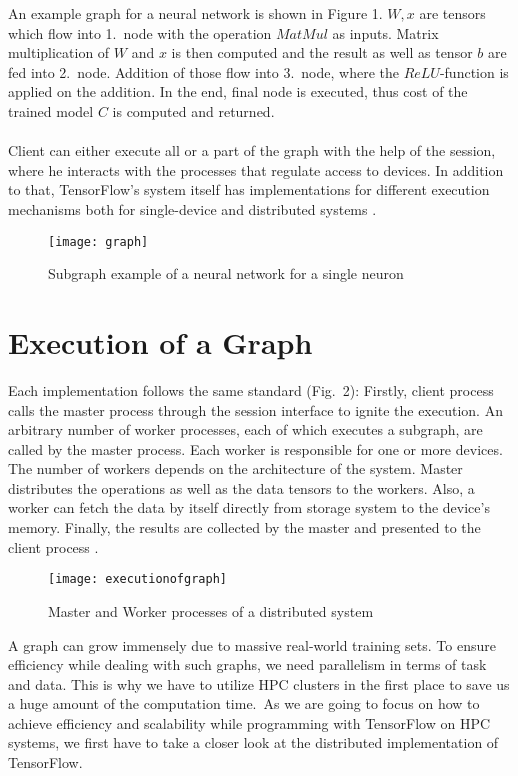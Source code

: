 \documentclass[ieeetran]{article}
\begin{document}
An example graph for a neural network is shown in Figure 1. $W, x$ are tensors which flow into 1.\ node with the operation $MatMul$ as inputs. Matrix multiplication of $W$ and $x$ is then computed and the result as well as tensor $b$ are fed into 2.\ node. Addition of those flow into 3.\ node, where the $ReLU$-function is applied on the addition. In the end, final node is executed, thus cost of the trained model $C$ is computed and returned.
\\ \\Client can either execute all or a part of the graph with the help of the session, where he interacts with the processes that regulate access to devices. In addition to that, TensorFlow's system itself has implementations for different execution mechanisms both for single-device and distributed systems \cite{first}.
\begin{figure}[h!]
  \centering
   \texttt{[image: graph]}
\caption[placeholder]{Subgraph example of a neural network for a single neuron}
  \label{fig:graph_caption_placeholder_subgraph_example_for_a_neural_networkfootnotemark}
\end{figure}
\section{Execution of a Graph} %
\label{sec:execution_of_a_graph}
Each implementation follows the same standard (Fig.\ 2): Firstly, client process calls the master process through the session interface to ignite the execution. An arbitrary number of worker processes, each of which executes a subgraph, are called by the master process. Each worker is responsible for one or more devices. The number of workers depends on the architecture of the system. Master distributes the operations as well as the data tensors to the workers. Also, a worker can fetch the data by itself directly from storage system to the device's memory. Finally, the results are collected by the master and presented to the client process \cite{first}.
\begin{figure}[h!]
  \centering
\texttt{[image: executionofgraph]}
 \caption[placeholder]{Master and Worker processes of a distributed system} 
  \label{fig:executionofgraph}
\end{figure}

\hspace{-0.51cm}A graph can grow immensely due to massive real-world training sets. To ensure efficiency while dealing with such graphs, we need parallelism in terms of task and data. This is why we have to utilize HPC clusters in the first place to save us a huge amount of the computation time.\ As we are going to focus on how to achieve efficiency and scalability while programming with TensorFlow on HPC systems, we first have to take a closer look at the distributed implementation of TensorFlow.
\end{document}
